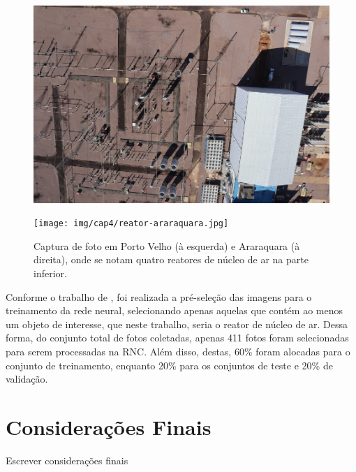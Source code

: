 \begin{figure}[!h]
    \centering
    \begin{minipage}[b]{0.45\linewidth}
        \centering
        \includegraphics[width=\linewidth]{img/cap4/reator-porto-velho.jpeg}
    \end{minipage}
    \hspace{0.05\linewidth}
    \begin{minipage}[b]{0.45\linewidth}
        \centering
        \texttt{[image: img/cap4/reator-araraquara.jpg]}
    \end{minipage}
    \captionsetup{justification=centering,margin=0.5cm,font=small}
    \caption{Captura de foto em Porto Velho (à esquerda) e Araraquara (à direita), onde se notam quatro reatores de núcleo de ar na parte inferior.} 
    \label{fig:reatores}
\end{figure}

Conforme o trabalho de \cite{sa2024yolov8}, foi realizada a pré-seleção das imagens para o treinamento da rede neural, selecionando apenas aquelas que contém ao menos um objeto de interesse, que neste trabalho, seria o reator de núcleo de ar. Dessa forma, do conjunto total de fotos coletadas, apenas 411 fotos foram selecionadas para serem processadas na RNC. Além disso, destas, 60\% foram alocadas para o conjunto de treinamento, enquanto 20\% para os conjuntos de teste e 20\% de validação.

\section{Considerações Finais}

Escrever considerações finais

